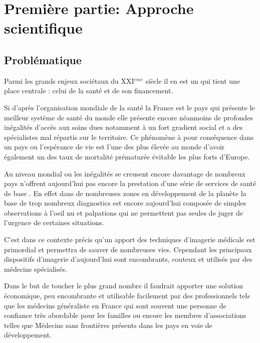 \documentclass[12pt]{article}
\renewcommand{\footrulewidth}{1pt}
\begin{document}
\renewcommand{\footrulewidth}{1pt}
\fancyfoot[L]{\leftmark}
\newpage
\section{Première partie: Approche scientifique }
\subsection{Problématique}

Parmi les grands enjeux sociétaux du XXI$^{eme}$ siècle il en est un qui tient une place centrale : celui de la santé et de son financement.\par 
Si d'après l'organisation mondiale de la santé la France est le pays qui présente le meilleur système de santé du monde elle présente encore néanmoins de profondes inégalités d'accès aux soins dues notamment à un fort gradient social et a des spécialistes mal répartis sur le territoire. Ce phénomène à pour conséquence dans un pays ou l'espérance de vie est l'une des plus élevée au monde d'avoir également un des taux de mortalité prématurée évitable les plus forts d'Europe. \par 

Au niveau mondial ou les inégalités se creusent encore davantage de nombreux pays n'offrent aujourd'hui pas encore la prestation d'une série de services de santé de base \cite{OMS1}.
En effet dans de nombreuses zones en développement de la planète la base de trop nombreux diagnostics est encore aujourd'hui composée de simples observations à l'oeil nu et palpations qui ne permettent pas seules de juger de l'urgence de certaines situations. \par

C'est dans ce contexte précis qu'un apport des techniques d'imagerie médicale est primordial et permettra de sauver de nombreuses vies. Cependant les principaux dispositifs d'imagerie d'aujourd'hui sont encombrants, couteux et utilisés par des médecins spécialisés. \par
Dans le but de toucher le plus grand nombre il faudrait apporter une solution économique, peu encombrante et utilisable facilement par des professionnels tels que les médecins généraliste en France qui sont souvent une personne de confiance très abordable pour les familles ou encore les membres d'associations telles que Médecins sans frontières présents dans les pays en voie de développement.\par
\vspace{10pt}
\end{document}
